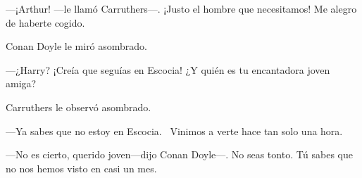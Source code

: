 ---¡Arthur! ---le llamó Carruthers---. ¡Justo el hombre que
necesitamos! Me alegro de haberte cogido.

Conan Doyle le miró asombrado.

---¿Harry? ¡Creía que seguías en Escocia! ¿Y quién es tu encantadora
joven amiga?

Carruthers le observó asombrado.

---Ya sabes que no estoy en Escocia. ~Vinimos a verte hace tan solo una
hora.

---No es cierto, querido joven---dijo Conan Doyle---. No seas tonto. Tú
sabes que no nos hemos visto en casi un mes.
